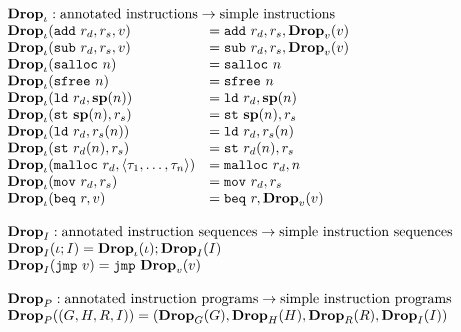 {\[\begin{array}{l}
\begin{array}{ll}
\rlap{$\mathbf{Drop}_\iota : \text{annotated instructions} -> \text{simple instructions}$} \\
\drop{\iota}{\mathtt{add}\ r_d, r_s, v} &= \mathtt{add}\ r_d, r_s, \drop{v}{v} \\
\drop{\iota}{\mathtt{sub}\ r_d, r_s, v} &= \mathtt{sub}\ r_d, r_s, \drop{v}{v} \\
\drop{\iota}{\mathtt{salloc}\ n} &= \mathtt{salloc}\ n \\
\drop{\iota}{\mathtt{sfree}\ n} &= \mathtt{sfree}\ n \\
\drop{\iota}{\mathtt{ld}\ r_d, \mathbf{sp}(n)} &= \mathtt{ld}\ r_d, \mathbf{sp}(n) \\
\drop{\iota}{\mathtt{st}\ \mathbf{sp}(n), r_s} &= \mathtt{st}\ \mathbf{sp}(n), r_s \\
\drop{\iota}{\mathtt{ld}\ r_d, r_s(n)} &= \mathtt{ld}\ r_d, r_s(n) \\
\drop{\iota}{\mathtt{st}\ r_d(n), r_s} &= \mathtt{st}\ r_d(n), r_s \\
\drop{\iota}{\mathtt{malloc}\ r_d, \langle \tau_1, \dots, \tau_n \rangle} &= \mathtt{malloc}\ r_d, n \\
\drop{\iota}{\mathtt{mov}\ r_d, r_s} &= \mathtt{mov}\ r_d, r_s \\
\drop{\iota}{\mathtt{beq}\ r, v} &= \mathtt{beq}\ r, \drop{v}{v} \\
\end{array} \\\\

\begin{array}{l}
\rlap{$\mathbf{Drop}_I : \text{annotated instruction sequences} -> \text{simple instruction sequences}$} \\
\drop{I}{\iota ; I} = \drop{\iota}{\iota} ; \drop{I}{I} \\
\drop{I}{\mathtt{jmp}\ v} = \mathtt{jmp}\ \drop{v}{v}
\end{array} \\\\

\begin{array}{l}
\rlap{$\mathbf{Drop}_P : \text{annotated instruction programs} -> \text{simple instruction programs}$} \\
\drop{P}{(G, H, R, I)} = (\drop{G}{G}, \drop{H}{H}, \drop{R}{R}, \drop{I}{I})
\end{array} \\\\

\end{array}\]
}
